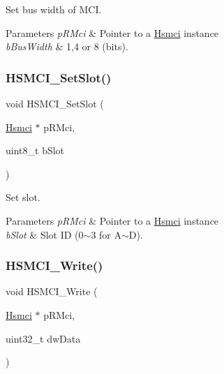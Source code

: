 Set bus width of M\+CI. 


\begin{DoxyParams}{Parameters}
{\em p\+R\+Mci} & Pointer to a \mbox{\hyperlink{structHsmci}{Hsmci}} instance \\
\hline
{\em b\+Bus\+Width} & 1,4 or 8 (bits). \\
\hline
\end{DoxyParams}
\mbox{\label{group__hsmci__functions_gaa994954a36c86927aa59db8b8737c47f}} 
\subsubsection{\texorpdfstring{HSMCI\_SetSlot()}{HSMCI\_SetSlot()}}
{\footnotesize\ttfamily void H\+S\+M\+C\+I\+\_\+\+Set\+Slot (\begin{DoxyParamCaption}\item[{\mbox{\hyperlink{structHsmci}{Hsmci}} $\ast$}]{p\+R\+Mci,  }\item[{uint8\+\_\+t}]{b\+Slot }\end{DoxyParamCaption})}



Set slot. 


\begin{DoxyParams}{Parameters}
{\em p\+R\+Mci} & Pointer to a \mbox{\hyperlink{structHsmci}{Hsmci}} instance \\
\hline
{\em b\+Slot} & Slot ID (0$\sim$3 for A$\sim$D). \\
\hline
\end{DoxyParams}
\mbox{\label{group__hsmci__functions_gacaabbc538539863298c3f2db59a2f894}} 
\subsubsection{\texorpdfstring{HSMCI\_Write()}{HSMCI\_Write()}}
{\footnotesize\ttfamily void H\+S\+M\+C\+I\+\_\+\+Write (\begin{DoxyParamCaption}\item[{\mbox{\hyperlink{structHsmci}{Hsmci}} $\ast$}]{p\+R\+Mci,  }\item[{uint32\+\_\+t}]{dw\+Data }\end{DoxyParamCaption})}



